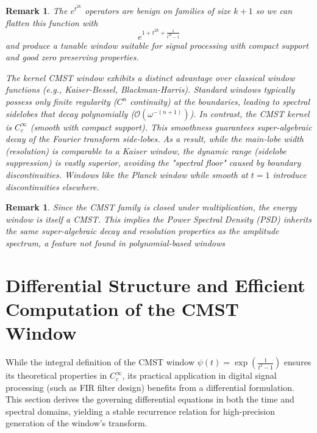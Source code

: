 \documentclass[11pt]{article}
\theoremstyle{breakdef}
\newtheorem{remark}[theorem]{Remark}
\begin{document}
\begin{remark}
The $e^{t^{2k}}$ operators are benign on families of size $k+1$ so we can flatten this function with 
\begin{equation}
e^{1+t^{2 k}+\frac{1}{t^{2 k}-1}}
\end{equation}
and produce a tunable window suitable for signal processing with compact support and good zero preserving properties.

The kernel CMST window exhibits a distinct advantage over classical window functions (e.g., Kaiser-Bessel, Blackman-Harris). 
Standard windows typically possess only finite regularity ($C^n$ continuity) at the boundaries, leading to spectral sidelobes that decay polynomially ($\mathcal{O}(\omega^{-(n+1)})$).
In contrast, the CMST kernel is $C_c^\infty$ (smooth with compact support). 
This smoothness guarantees super-algebraic decay of the Fourier transform side-lobes.
As a result, while the main-lobe width (resolution) is comparable to a Kaiser window, the dynamic range (sidelobe suppression) is vastly superior, avoiding the "spectral floor" caused by boundary discontinuities.  Windows like the Planck window while smooth at $t = 1$ introduce discontinuities elsewhere.
\end{remark}

\begin{remark}
Since the CMST family is closed under multiplication, the energy window is itself a CMST. This implies the Power Spectral Density (PSD) inherits the same super-algebraic decay and resolution properties as the amplitude spectrum, a feature not found in polynomial-based windows
\end{remark}


\section{Differential Structure and Efficient Computation of the CMST Window}

While the integral definition of the CMST window $\psi(t) = \exp\left( \frac{1}{t^2-1} \right)$ ensures its theoretical properties in $C_c^\infty$, its practical application in digital signal processing (such as FIR filter design) benefits from a differential formulation. 
This section derives the governing differential equations in both the time and spectral domains, yielding a stable recurrence relation for high-precision generation of the window's transform.
\end{document}
